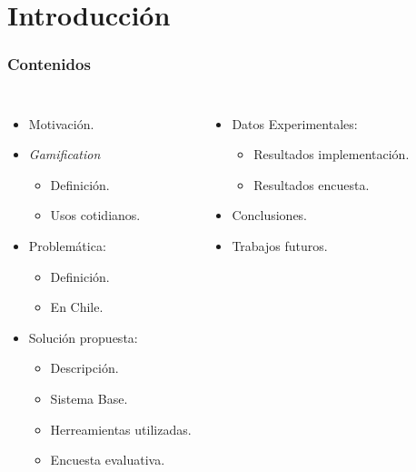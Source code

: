\documentclass[10pt, compress]{beamer}
\begin{document}
\section{Introducción}

\begin{frame}[fragile]
  \frametitle{Contenidos}

\begin{columns}[onlytextwidth]
  \begin{itemize}[<+- | alert@+>]
    \item Motivación.
    \item \emph{Gamification}
	\begin{itemize}[<+- | alert@+>]
	  \item Definición.
	  \item Usos cotidianos.
	\end{itemize}
    \item Problemática:
	\begin{itemize}[<+- | alert@+>]
          \item Definición.
          \item En Chile.
        \end{itemize}
    \item Solución propuesta:
	\begin{itemize}[<+- | alert@+>]
          \item Descripción.
          \item Sistema Base.
	  \item Herreamientas utilizadas.
	  \item Encuesta evaluativa.
        \end{itemize}
\end{itemize}

  \begin{itemize}[<+- | alert@+>]
    \item Datos Experimentales:
	\begin{itemize}[<+- | alert@+>]
          \item Resultados implementación.
          \item Resultados encuesta.
        \end{itemize}
    \item Conclusiones.
    \item Trabajos futuros.
  \end{itemize}
\end{columns}
\end{frame}
\end{document}
